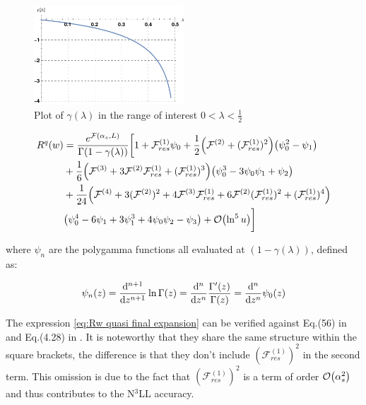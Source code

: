 \documentclass[../main.tex]{subfiles}
\begin{document}
\begin{figure}
    \centering
    \includegraphics[width=0.5\textwidth]{figures/gamma_lambda.png}
    \caption{Plot of $\gamma(\lambda)$ in the range of interest $0<\lambda<\frac{1}{2}$}
    \label{fig:gamma_lambda}
\end{figure}
 
\begin{align}
    \begin{split}\label{eq:Rw quasi final expansion}
        R^q(w) &= \frac{e^{\mathcal{F}(\alpha_s,L)}}{\Gamma(1-\gamma(\lambda))} \biggl[ 1 + \mathcal{F}^{(1)}_{res} \psi_0 + \frac{1}{2}\qty( \mathcal{F}^{(2)}+(\mathcal{F}^{(1)}_{res})^2) \qty(\psi_0^2-\psi_1) \\
        &+ \frac{1}{6}\qty(\mathcal{F}^{(3)} + 3 \mathcal{F}^{(2)}\mathcal{F}^{(1)}_{res} + (\mathcal{F}^{(1)}_{res})^3 ) \qty(\psi_0^3 -3 \psi_0\psi_1+\psi_2) \\
        &+ \frac{1}{24}\qty(\mathcal{F}^{(4)} + 3(\mathcal{F}^{(2)})^2 + 4 \mathcal{F}^{(3)} \mathcal{F}^{(1)}_{res} + 6 \mathcal{F}^{(2)} (\mathcal{F}^{(1)}_{res})^2 + (\mathcal{F}^{(1)}_{res})^4 ) \\
        &\qty(\psi_0^4 -6 \psi_1 + 3\psi_1^3 +4\psi_0\psi_2 -\psi_3)+ \order{\ln^5 u} \biggr]
    \end{split}
\end{align}

where $\psi_n$ are the polygamma functions all evaluated at $(1-\gamma(\lambda))$, defined as:

\begin{equation}
    \psi_n (z) = \dv[n+1]{z} \ln \Gamma(z) = \dv[n]{z} \frac{\Gamma '(z)}{\Gamma(z)} = \dv[n]{z} \psi_0(z)
\end{equation}

The expression \cref{eq:Rw quasi final expansion} can be verified against Eq.(56) in \cite{Aglietti:2002ew} and Eq.(4.28) in \cite{Monni:2011gb}.
It is noteworthy that they share the same structure within the square brackets, the difference is that they don't include $(\mathcal{F}^{(1)}_{res})^2$ in the second term.
This omission is due to the fact that $(\mathcal{F}^{(1)}_{res})^2$ is a term of order $\order{\alpha_s^2}$ and thus contributes to the N$^3$LL accuracy.
\end{document}
